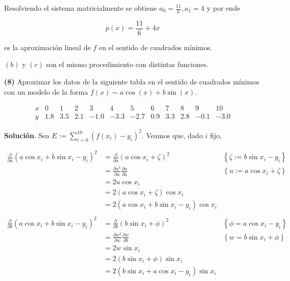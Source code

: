 \documentclass[12pt]{article}
\begin{document}
Resolviendo el sistema matricialmente se obtiene $a_0 = \frac{11}{6}, a_1 = 4$ y
por ende 

\begin{equation*}
    p(x) = \frac{11}{6} + 4x
\end{equation*}

es la aproximación lineal de $f$ en el sentido de cuadrados mínimos.

$(b)$ y $(c)$ son el mismo procedimiento con distintas funciones.

\pagebreak 


\begin{myframe}
    \textbf{(8)} Aproximar los datos de la siguiente tabla en el sentido de
    cuadrados mínimos con un modelo de la forma
$f(x) \sim a\cos(x) + b\sin(x).$

\[
\begin{array}{c|ccccccccccc}
x & 0 & 1 & 2 & 3 & 4 & 5 & 6 & 7 & 8 & 9 & 10 \\
\hline
y & 1.8 & 3.5 & 2.1 & -1.0 & -3.3 & -2.7 & 0.9 & 3.3 & 2.8 & -0.1 & -3.0
\end{array}
\]
\end{myframe}


\textbf{Solución}. Sea $E := \sum_{i=0}^{10} \left( f(x_i) - y_i \right)^2 $. Veamos que, dado $i$ fijo,

\begin{align*}
    \frac{\partial }{\partial a} ( a \cos x_i + b \sin x_i - y_i )^2 &= \frac{\partial }{\partial a} \left( a \cos x_i + \zeta \right)^2 &\left\{ \zeta := b \sin x_i - y_i \right\} \\ 
    &= \frac{\partial u^2}{\partial u} \frac{\partial u}{\partial a} &\left\{u := a \cos x_i + \zeta \right\} \\ 
    &= 2u \cos x_i \\ 
    &= 2(a \cos x_i + \zeta) \cos x_i \\ 
    &= 2\left( a \cos x_i + b \sin x_i - y_i \right) \cos x_i \\ 
    ~ \\ 
    \frac{\partial }{\partial b} \left( a \cos x_i + b \sin x_i - y_i \right)^2 &= \frac{\partial }{\partial b} ( b \sin x_i  + \phi)^2 &\left\{ \phi = a \cos x_i - y_i \right\}  \\ 
    &=\frac{\partial w^2}{\partial w} \frac{\partial w}{\partial b} &\left\{ w = b \sin x_i + \phi \right\}  \\ 
    &=2w \sin x_i \\ 
    &=2(b \sin x_i + \phi) \sin x_i \\ 
    &=2(b \sin x_i + a \cos x_i - y_i) \sin x_i
\end{align*}
\end{document}
